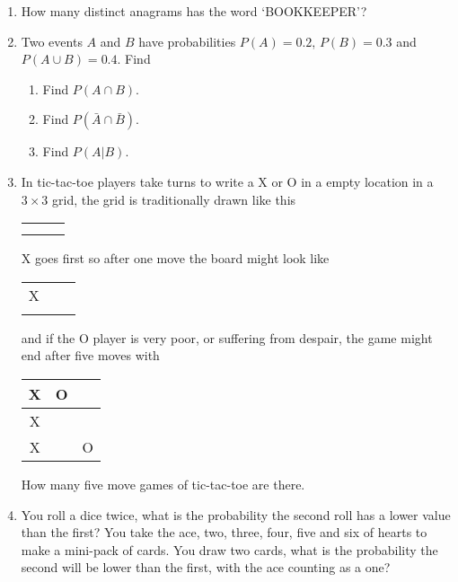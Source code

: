 \documentclass[11pt,a4paper]{scrartcl}
\begin{document}
\begin{enumerate}

\item How many distinct anagrams has the word `BOOKKEEPER'?

\item Two events $A$ and $B$ have probabilities $P(A)=0.2$, $P(B)=0.3$ and $P(A\cup B)=0.4$. Find
\begin{enumerate}
\item Find $P(A\cap B)$.
\item Find $P(\bar{A}\cap \bar{B})$.
\item Find $P(A|B)$.
\end{enumerate}

\item In tic-tac-toe players take turns to write a X or O in a empty location in a $3\times 3$ grid, the grid is traditionally drawn like this
  {\Huge
\begin{center}
\begin{tabular}{c|c|c}
 \phantom{X}&\phantom{O}  &\phantom{O}  \\ \hline
 &\phantom{X}  & \phantom{X}\\ \hline
 &  &\phantom{O}
\end{tabular}
\end{center}
}
  X goes first so after one move the board might look like
  {\Huge
\begin{center}
  \begin{tabular}{c|c|c}
     \phantom{X}&\phantom{O}  &\phantom{O}  \\ \hline
  X&  & \\ \hline
 &  &\phantom{O}
\end{tabular}
\end{center}
}
and if the O player is very poor, or suffering from despair, the game might end after five moves with
  {\Huge
\begin{center}
  \begin{tabular}{c|c|c}
     X&O  &\phantom{O}  \\ \hline
  X&  & \\ \hline
 X&  &O
\end{tabular}
\end{center}
  }
  How many five move games of tic-tac-toe are there.

\item You roll a dice twice, what is the probability the second roll
  has a lower value than the first? You take the ace, two, three,
  four, five and six of hearts to make a mini-pack of cards. You draw
  two cards, what is the probability the second will be lower than the
  first, with the ace counting as a one?

  
\end{enumerate}
\end{document}
